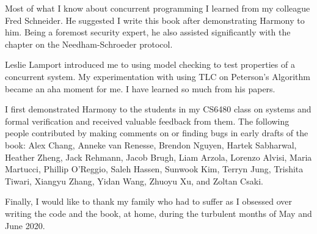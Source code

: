 \documentclass{report}
\begin{document}
Most of what I know about concurrent programming I learned from
my colleague Fred Schneider.  He suggested I write this book after
demonstrating Harmony to him.  Being a foremost security expert, he also
assisted significantly with the chapter on the Needham-Schroeder protocol.

Leslie Lamport introduced me to using model checking to test properties
of a concurrent system.  My experimentation with using TLC on Peterson's
Algorithm became an aha moment for me.  I have learned so much from his
papers.

I first demonstrated Harmony to the students in my CS6480 class on systems
and formal verification and received valuable feedback from them.
The following people contributed by making comments on or finding bugs in
early drafts of the book:
Alex Chang,
Anneke van Renesse,
Brendon Nguyen,
Hartek Sabharwal,
Heather Zheng,
Jack Rehmann,
Jacob Brugh,
Liam Arzola,
Lorenzo Alvisi,
Maria Martucci,
Phillip O'Reggio,
Saleh Hassen,
Sunwook Kim,
Terryn Jung,
Trishita Tiwari,
Xiangyu Zhang,
Yidan Wang,
Zhuoyu Xu,
and
Zoltan Csaki.

Finally, I would like to thank my family who had to suffer as I obsessed
over writing the code and the book, at home, during the turbulent months of
May and June 2020.


\cleardoublepage
{}
\printindex

\cleardoublepage
{}
\printglossaries

\end{document}
